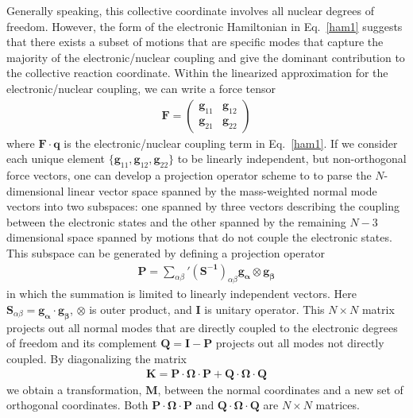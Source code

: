 Generally speaking, this collective coordinate involves all nuclear degrees of freedom.
However, the form of the electronic Hamiltonian in Eq.~\ref{ham1} suggests that
there exists a subset of motions that are specific modes  that capture the majority of the
electronic/nuclear coupling and give the dominant contribution to the collective
reaction coordinate.  Within the linearized approximation for the electronic/nuclear coupling,
we can write a force tensor
\begin{eqnarray}
{\mathbf F} =
\left(\begin{array}{cc}
{\mathbf g}_{11}&{\mathbf g}_{12} \\
{\mathbf g}_{21} &{\mathbf g}_{22}
\end{array}\right)
\end{eqnarray}
where ${\mathbf F}\cdot \mathbf q$ is the electronic/nuclear coupling term in Eq.~\ref{ham1}.
If we consider each unique element $\{ \mathbf g_{11}, \mathbf g_{12} , \mathbf g_{22}\}$ to be
linearly independent, but non-orthogonal force vectors,  one can develop a  projection operator scheme to
to parse the $N$-dimensional linear vector space spanned by the mass-weighted normal mode vectors into two subspaces:
one spanned by three vectors describing the coupling between the electronic states
and the other spanned by the remaining $N-3$ dimensional space spanned by motions that
do not couple the electronic states.
This  subspace  can be generated by defining a projection operator
\begin{eqnarray}
\mathbf{P}=\sum_{\alpha\beta}'\left(\mathbf{S^{-1}}\right)_{\alpha\beta}\mathbf{g_{\alpha}}\otimes\mathbf{g_{\beta}}
\end{eqnarray}
in which the summation is limited to linearly independent vectors.
   Here $\mathbf{S}_{\alpha\beta}=\mathbf{g_{\alpha}}\cdot\mathbf{g_{\beta}}$,
$\otimes$ is outer product,  and $\mathbf{I}$ is unitary operator.
This $N\times N$ matrix projects out all normal modes that are directly coupled to the
electronic degrees of freedom and
 its complement $\mathbf{Q}=\mathbf{I}-\mathbf{P}$ projects out all modes not directly coupled.
By diagonalizing the matrix
\begin{eqnarray}
\mathbf{K}=\mathbf{P}\cdot\mathbf\Omega\cdot \mathbf{P}+\mathbf{Q}\cdot\mathbf\Omega\cdot\mathbf{Q}
\end{eqnarray}
we obtain a  transformation, ${\mathbf M}$,  between the normal coordinates and a new set of orthogonal
coordinates.  Both $\mathbf{P}\cdot\mathbf\Omega\cdot \mathbf{P}$ and $\mathbf{Q}\cdot\mathbf\Omega\cdot\mathbf{Q}$ are $N\times N$ matrices.

